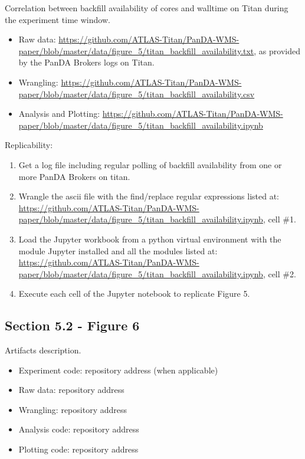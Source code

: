 Correlation between backfill availability of cores and walltime on Titan during the experiment time window.

\begin{itemize}
    \item Raw data: \url{https://github.com/ATLAS-Titan/PanDA-WMS-paper/blob/master/data/figure_5/titan_backfill_availability.txt}, as provided by the PanDA Brokers logs on Titan.
    \item Wrangling: \url{https://github.com/ATLAS-Titan/PanDA-WMS-paper/blob/master/data/figure_5/titan_backfill_availability.csv}
    \item Analysis and Plotting: \url{https://github.com/ATLAS-Titan/PanDA-WMS-paper/blob/master/data/figure_5/titan_backfill_availability.ipynb}
\end{itemize}

Replicability:

\begin{enumerate}
    \item Get a log file including regular polling of backfill availability from one or more PanDA Brokers on titan.
    \item Wrangle the ascii file with the find/replace regular expressions listed at: \url{https://github.com/ATLAS-Titan/PanDA-WMS-paper/blob/master/data/figure_5/titan_backfill_availability.ipynb}, cell \#1.
    \item Load the Jupyter workbook from a python virtual environment with the module Jupyter installed and all the modules listed at: \url{https://github.com/ATLAS-Titan/PanDA-WMS-paper/blob/master/data/figure_5/titan_backfill_availability.ipynb}, cell \#2.
    \item Execute each cell of the Jupyter notebook to replicate Figure 5.
\end{enumerate}


\subsection{Section 5.2 - Figure 6}
\label{apndx:fig6}

Artifacts description.

\begin{itemize}
    \item Experiment code: repository address (when applicable)
    \item Raw data: repository address
    \item Wrangling: repository address
    \item Analysis code: repository address
    \item Plotting code: repository address
\end{itemize}

